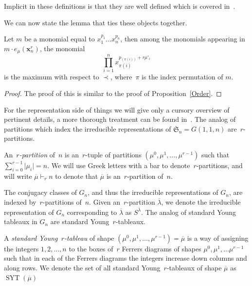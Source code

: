 \documentclass[ALCO,ThmDefs,Unicode,epreuves]{cedram}
\DeclareMathOperator{\SYT}{SYT}
\begin{document}
	Implicit in these definitions is that they are well defined which is covered in~\cite{BB}.

	We can now state the lemma that ties these objects together.

\begin{lemm}

\label{Order2}

Let $m$ be a monomial equal to $x_1^{p_1}\ldots x_n^{p_n}$, then
among the monomials appearing in $m\cdot e_{\mu}(\mathbf{x}_n^r)$, the monomial
\begin{equation}
\prod_{i=1}^n 
x_{\pi(i)}^{p_{(\pi(i))}+r\mu'_i}
\end{equation}
is the maximum with respect to $\prec$, where~$\pi$ is the index permutation of 
$m$.
	\begin{proof}
	The proof of this is similar to the proof of Proposition~\ref{Order}.
	\end{proof}


\end{lemm}



For the representation side of things we will give only a cursory overview of pertinent details, a more thorough treatment can 
be found in~\cite{Stem}.
The analog of partitions which index the irreducible representations of $\mathfrak{S}_n=G(1,1,n)$ are~$r$-partitions.

	\begin{defi}
		An~\emph{$r$-partition} of~$n$ is an~$r$-tuple of partitions $(\mu^0,\mu^1,\ldots, \mu^{r-1})$ such that 
$\sum_{i=0}^{r-1} \vert \mu_i\vert=n$.
		We will use Greek letters with a bar to denote~$r$-partitions, and will write $\overline{\mu}\vdash_r n$ to denote 
that $\overline{\mu}$ is an~$r$-partition of~$n$.

	\end{defi}

The conjugacy classes of $G_n$, and thus the irreducible representations of $G_n$, are indexed by~$r$-partitions of~$n$. 
Given an~$r$-partition $\overline{\lambda}$, we denote the irreducible representation of $G_n$ corresponding to 
$\overline{\lambda}$ as $S^{\overline{\lambda}}$. The analog of standard Young tableaux in $G_n$ are standard Young~$r$-tableaux.

	\begin{defi}
		A \emph{standard Young~$r$-tableau} of shape $(\mu^0,\mu^1,\ldots, \mu^{r-1})=\overline{\mu}$ is a way of assigning 
the integers $1,2,\ldots, n$ to the boxes of~$r$ Ferrers diagrams of shapes $\mu^0, \mu^1,\ldots \mu^{r-1}$ such that 
in each of the Ferrers diagrams the integers increase down columns and along rows. We denote the set of all standard 
Young~$r$-tableaux of shape $\overline{\mu}$ as $\SYT (\overline{\mu})$

	\end{defi}
\end{document}

